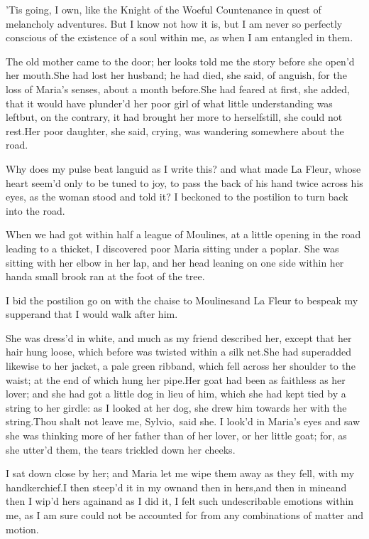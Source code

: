 \documentclass[twoside]{article}
\begin{document}
’Tis going, I own, like the Knight of the
Woeful Countenance in quest of melancholy
adventures.  But I know not how it is, but
I am never so perfectly conscious of the
existence of a soul within me, as when I
am entangled in them.

The old mother came to the door; her looks
told me the story before she open’d her
mouth.\tskk She had lost her husband; he
had died, she said, of anguish, for the
loss of Maria’s senses, about a month
before.\tskk She had feared at first, she
added, that it would have plunder’d her
poor girl of what little understanding was
left\tskk but, on the contrary, it had
brought her more to herself\tskk still,
she could not rest.\tskk Her poor
daughter, she said, crying, was wandering
somewhere about the road.

Why does my pulse beat languid as I write
this? and what made La Fleur, whose heart
seem’d only to be tuned to joy, to pass
the back of his hand twice across his
eyes, as the woman stood and told it?  I
beckoned to the postilion to turn back
into the road.

When we had got within half a league of
Moulines, at a little opening in the road
leading to a thicket, I discovered poor
Maria sitting under a poplar.  She was
sitting with her elbow in her lap, and her
head leaning on one side within her
hand\tskk a small brook ran at the foot
of the tree.

I bid the postilion go on with the chaise
to Moulines\tskk and La Fleur to bespeak
my supper\tskk and that I would walk
after him.

She was dress’d in white, and much as my
friend described her, except that her hair
hung loose, which before was twisted
within a silk net.\tskk She had superadded
likewise to her jacket, a pale green
ribband, which fell across her shoulder to
the waist; at the end of which hung her
pipe.\tskk Her goat had been as faithless
as her lover; and she had got a little dog
in lieu of him, which she had kept tied by
a string to her girdle: as I looked at her
dog, she drew him towards her with the
string.\tskk \lqq Thou shalt not leave me,
Sylvio,\rqq\ said she.  I look’d in Maria’s
eyes and saw she was thinking more of her
father than of her lover, or her little
goat; for, as she utter’d them, the tears
trickled down her cheeks.

I sat down close by her; and Maria let me
wipe them away as they fell, with my
handkerchief.\tskk I then steep’d it in my
own\tskk and then in hers,\tskk and then
in mine\tskk and then I wip’d hers
again\tskk and as I did it, I felt such
undescribable emotions within me, as I am
sure could not be accounted for from any
combinations of matter and motion.
\end{document}
